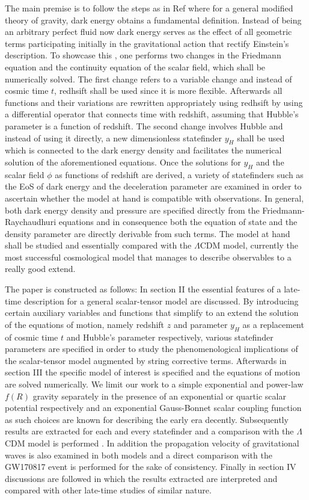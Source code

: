 \documentclass[aps,prd,twocolumn,groupedaddress,showpacs,nofootinbib,amssymb]{revtex4-2}
\begin{document}
The main premise is to follow the steps as in Ref\cite{Odintsov:2020vjb,Odintsov:2021nim} where for a general modified theory of gravity, dark energy obtains a fundamental definition. Instead of being an arbitrary perfect fluid now dark energy serves as the effect of all geometric terms participating initially in the gravitational action that rectify Einstein's description. To showcase this , one performs two changes in the Friedmann equation and the continuity equation of the scalar field, which shall be numerically solved. The first change refers to a variable change and instead of cosmic time $t$, redhsift shall be used since it is more flexible. Afterwards all functions and their variations are rewritten appropriately using redhsift by using a differential operator that connects time with redshift, assuming that Hubble's parameter is a function of redshift. The second change involves Hubble and instead of using it directly, a new dimensionless statefinder $y_H$ shall be used which is connected to the dark energy density and facilitates the numerical solution of the aforementioned equations. Once the solutions for $y_H$ and the scalar field $\phi$ as functions of redshift are derived, a variety of statefinders such as the EoS of dark energy and the deceleration parameter are examined in order to ascertain whether the model at hand is compatible with observations. In general, both dark energy density and pressure are specified directly from the Friedmann-Raychaudhuri equations and in consequence both the equation of state and the density parameter are directly derivable from such terms. The model at hand shall be studied and essentially compared with the $\Lambda$CDM model, currently the most successful cosmological model that manages to describe observables to a really good extend.

The paper is constructed as follows: In section II the essential features of a late-time description for a general scalar-tensor model are discussed. By introducing certain auxiliary variables and functions that simplify to an extend the solution of the equations of motion, namely redshift $z$ and parameter $y_H$ as a replacement of cosmic time $t$ and Hubble's parameter respectively, various statefinder parameters are specified in order to study the phenomenological implications of the scalar-tensor model augmented by string corrective terms. Afterwards in section III the specific model of interest is specified and the equations of motion are solved numerically. We limit our work to a simple exponential and power-law $f(R)$ gravity separately in the presence of an exponential or quartic scalar potential respectively and an exponential Gauss-Bonnet scalar coupling function as such choices are known for describing the early era decently. Subsequently results are extracted for each and every statefinder and a comparison with the $\Lambda$CDM model  is performed \cite{Aghanim:2018eyx}. In addition the propagation velocity of gravitational waves is also examined in both models and a direct comparison with the GW170817 event is performed for the sake of consistency. Finally in section IV discussions are followed in which the results extracted are interpreted and compared with other late-time studies of similar nature.
\end{document}
